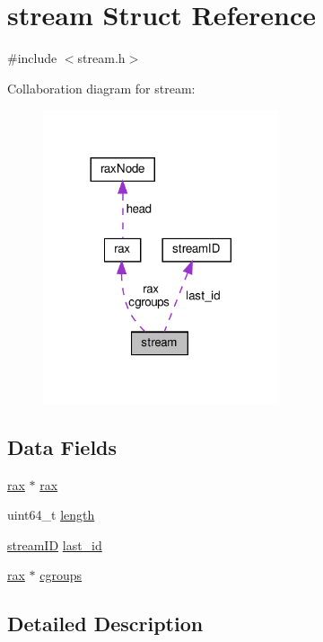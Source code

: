 \hypertarget{structstream}{}\section{stream Struct Reference}
\label{structstream}


{\ttfamily \#include $<$stream.\+h$>$}



Collaboration diagram for stream\+:
\nopagebreak
\begin{figure}[H]
\begin{center}
\leavevmode
\includegraphics[width=197pt]{structstream__coll__graph}
\end{center}
\end{figure}
\subsection*{Data Fields}
\begin{DoxyCompactItemize}
\item 
\hyperlink{structrax}{rax} $\ast$ \hyperlink{structstream_a5e94d4d7ba0112aeda6ee7b1ec15cf54}{rax}
\item 
uint64\+\_\+t \hyperlink{structstream_a190b76b1f3d5bd26920300e5f073739b}{length}
\item 
\hyperlink{structstream_i_d}{stream\+ID} \hyperlink{structstream_aaa32df2db581ba299a258cdc0db8e907}{last\+\_\+id}
\item 
\hyperlink{structrax}{rax} $\ast$ \hyperlink{structstream_a16c7dae1e1c61411ffe37afabe67de80}{cgroups}
\end{DoxyCompactItemize}


\subsection{Detailed Description}


